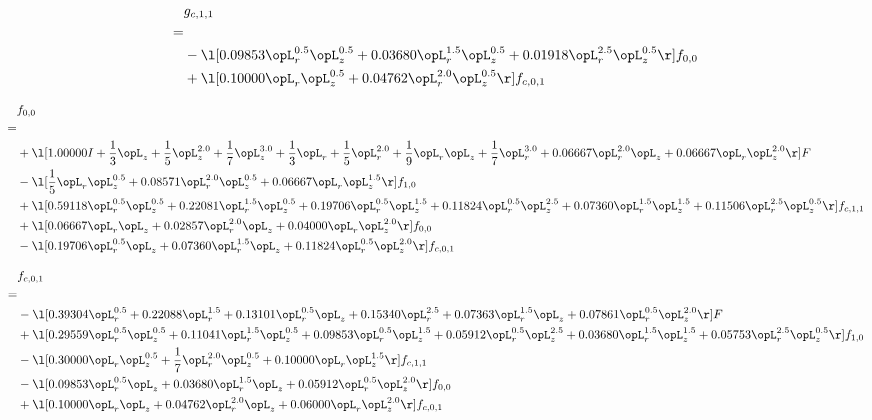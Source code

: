 \begin{alignat}{2} 
\label{eq:g_11_0} 
& g_{c,1,1} \nonumber \\ 
 = \\ 
& - \l[  0.09853 \opL_r^{0.5} \opL_z^{0.5} +  0.03680 \opL_r^{1.5} \opL_z^{0.5} +  0.01918 \opL_r^{2.5} \opL_z^{0.5}  \r] f_{0,0} \nonumber \\ 
& + \l[  0.10000 \opL_r \opL_z^{0.5} +  0.04762 \opL_r^{2.0} \opL_z^{0.5}  \r] f_{c,0,1} \nonumber \\ 
\end{alignat} 


\begin{alignat}{2} 
\label{eq:f_00_1} 
& f_{0,0} \nonumber \\ 
 = \\ 
& + \l[  1.00000 I + \frac{1}{3} \opL_z + \frac{1}{5} \opL_z^{2.0} + \frac{1}{7} \opL_z^{3.0} + \frac{1}{3} \opL_r + \frac{1}{5} \opL_r^{2.0} + \frac{1}{9} \opL_r \opL_z + \frac{1}{7} \opL_r^{3.0} +  0.06667 \opL_r^{2.0} \opL_z +  0.06667 \opL_r \opL_z^{2.0}  \r] F \nonumber \\ 
& - \l[ \frac{1}{5} \opL_r \opL_z^{0.5} +  0.08571 \opL_r^{2.0} \opL_z^{0.5} +  0.06667 \opL_r \opL_z^{1.5}  \r] f_{1,0} \nonumber \\ 
& + \l[  0.59118 \opL_r^{0.5} \opL_z^{0.5} +  0.22081 \opL_r^{1.5} \opL_z^{0.5} +  0.19706 \opL_r^{0.5} \opL_z^{1.5} +  0.11824 \opL_r^{0.5} \opL_z^{2.5} +  0.07360 \opL_r^{1.5} \opL_z^{1.5} +  0.11506 \opL_r^{2.5} \opL_z^{0.5}  \r] f_{c,1,1} \nonumber \\ 
& + \l[  0.06667 \opL_r \opL_z +  0.02857 \opL_r^{2.0} \opL_z +  0.04000 \opL_r \opL_z^{2.0}  \r] f_{0,0} \nonumber \\ 
& - \l[  0.19706 \opL_r^{0.5} \opL_z +  0.07360 \opL_r^{1.5} \opL_z +  0.11824 \opL_r^{0.5} \opL_z^{2.0}  \r] f_{c,0,1} \nonumber \\ 
\end{alignat} 


\begin{alignat}{2} 
\label{eq:f_01_1} 
& f_{c,0,1} \nonumber \\ 
 = \\ 
& - \l[  0.39304 \opL_r^{0.5} +  0.22088 \opL_r^{1.5} +  0.13101 \opL_r^{0.5} \opL_z +  0.15340 \opL_r^{2.5} +  0.07363 \opL_r^{1.5} \opL_z +  0.07861 \opL_r^{0.5} \opL_z^{2.0}  \r] F \nonumber \\ 
& + \l[  0.29559 \opL_r^{0.5} \opL_z^{0.5} +  0.11041 \opL_r^{1.5} \opL_z^{0.5} +  0.09853 \opL_r^{0.5} \opL_z^{1.5} +  0.05912 \opL_r^{0.5} \opL_z^{2.5} +  0.03680 \opL_r^{1.5} \opL_z^{1.5} +  0.05753 \opL_r^{2.5} \opL_z^{0.5}  \r] f_{1,0} \nonumber \\ 
& - \l[  0.30000 \opL_r \opL_z^{0.5} + \frac{1}{7} \opL_r^{2.0} \opL_z^{0.5} +  0.10000 \opL_r \opL_z^{1.5}  \r] f_{c,1,1} \nonumber \\ 
& - \l[  0.09853 \opL_r^{0.5} \opL_z +  0.03680 \opL_r^{1.5} \opL_z +  0.05912 \opL_r^{0.5} \opL_z^{2.0}  \r] f_{0,0} \nonumber \\ 
& + \l[  0.10000 \opL_r \opL_z +  0.04762 \opL_r^{2.0} \opL_z +  0.06000 \opL_r \opL_z^{2.0}  \r] f_{c,0,1} \nonumber \\ 
\end{alignat} 


